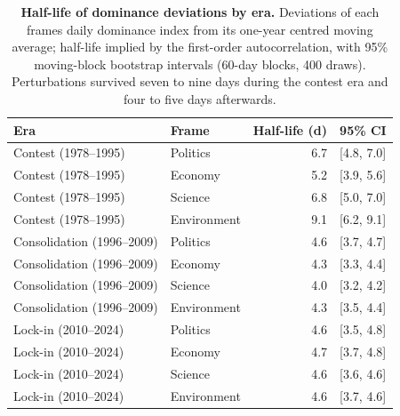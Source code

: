 \begin{table}[H]
\centering
\renewcommand{\arraystretch}{1.15}
\caption{\textbf{Half-life of dominance deviations by era.} Deviations
of each frame\textquotesingle s daily dominance index from its one-year centred
moving average; half-life implied by the first-order autocorrelation,
with 95\% moving-block bootstrap intervals (60-day blocks, 400 draws).
Perturbations survived seven to nine days during the contest era and
four to five days afterwards.}
\label{tab:si_halflife_era}
\vspace{0.3em}
\small
\begin{tabular}{@{}l l r l@{}}
\toprule
Era & Frame & Half-life (d) & 95\% CI \\
\midrule
Contest (1978--1995) & Politics & 6.7 & [4.8, 7.0] \\
Contest (1978--1995) & Economy & 5.2 & [3.9, 5.6] \\
Contest (1978--1995) & Science & 6.8 & [5.0, 7.0] \\
Contest (1978--1995) & Environment & 9.1 & [6.2, 9.1] \\
\addlinespace
Consolidation (1996--2009) & Politics & 4.6 & [3.7, 4.7] \\
Consolidation (1996--2009) & Economy & 4.3 & [3.3, 4.4] \\
Consolidation (1996--2009) & Science & 4.0 & [3.2, 4.2] \\
Consolidation (1996--2009) & Environment & 4.3 & [3.5, 4.4] \\
\addlinespace
Lock-in (2010--2024) & Politics & 4.6 & [3.5, 4.8] \\
Lock-in (2010--2024) & Economy & 4.7 & [3.7, 4.8] \\
Lock-in (2010--2024) & Science & 4.6 & [3.6, 4.6] \\
Lock-in (2010--2024) & Environment & 4.6 & [3.7, 4.6] \\
\bottomrule
\end{tabular}
\end{table}
